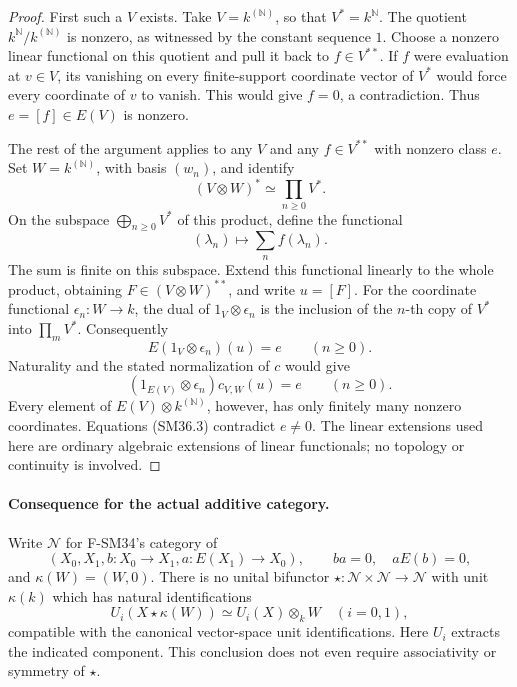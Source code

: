 \begin{proof}
First such a \(V\) exists.  Take \(V=k^{(\mathbb N)}\), so that
\(V^*=k^{\mathbb N}\).  The quotient
\(k^{\mathbb N}/k^{(\mathbb N)}\) is nonzero, as witnessed by
the constant sequence \(1\).  Choose a nonzero linear functional
on this quotient and pull it back to \(f\in V^{**}\).
If \(f\) were evaluation at \(v\in V\), its vanishing on every
finite-support coordinate vector of \(V^*\) would force every
coordinate of \(v\) to vanish.  This would give \(f=0\), a
contradiction.  Thus \(e=[f]\in E(V)\) is nonzero.

The rest of the argument applies to any \(V\) and any
\(f\in V^{**}\) with nonzero class \(e\).  Set
\(W=k^{(\mathbb N)}\), with basis \((w_n)\), and identify
\[
        (V\otimes W)^*\simeq\prod_{n\ge0}V^*.
\]
On the subspace \(\bigoplus_{n\ge0}V^*\) of this product,
define the functional
\[
             (\lambda_n)\longmapsto\sum_n f(\lambda_n).
\]
The sum is finite on this subspace.  Extend this functional
linearly to the whole product, obtaining
\(F\in(V\otimes W)^{**}\), and write \(u=[F]\).
For the coordinate functional \(\epsilon_n:W\to k\), the
dual of \(1_V\otimes\epsilon_n\) is the inclusion of the
\(n\)-th copy of \(V^*\) into \(\prod_mV^*\).  Consequently
\[
       E(1_V\otimes\epsilon_n)(u)=e\qquad(n\ge0).             \tag{SM36.2}
\]
Naturality and the stated normalization of \(c\) would give
\[
      (1_{E(V)}\otimes\epsilon_n)c_{V,W}(u)=e
                      \qquad(n\ge0).                        \tag{SM36.3}
\]
Every element of \(E(V)\otimes k^{(\mathbb N)}\), however,
has only finitely many nonzero coordinates.  Equations
(SM36.3) contradict \(e\ne0\).  The linear extensions used
here are ordinary algebraic extensions of linear functionals;
no topology or continuity is involved.
\end{proof}

\paragraph{Consequence for the actual additive category.}
Write \(\mathcal N\) for F-SM34's category of
\[
 (X_0,X_1,b:X_0\to X_1,a:E(X_1)\to X_0),
 \qquad ba=0,\quad aE(b)=0,
\]
and \(\kappa(W)=(W,0)\).  There is no unital bifunctor
\(\star:\mathcal N\times\mathcal N\to\mathcal N\) with
unit \(\kappa(k)\) which has natural identifications
\[
 U_i(X\star\kappa(W))\simeq U_i(X)\otimes_kW
                  \quad(i=0,1),                             \tag{SM36.4}
\]
compatible with the canonical vector-space unit identifications.
Here \(U_i\) extracts the indicated component.  This conclusion
does not even require associativity or symmetry of \(\star\).

